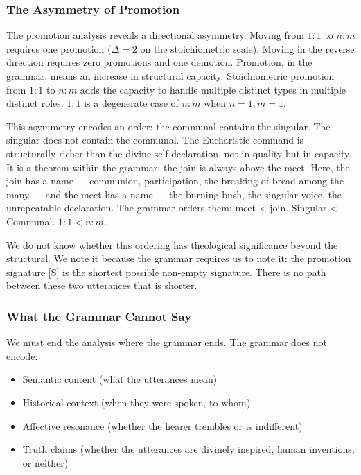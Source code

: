 \documentclass[12pt,a4paper]{article}
\begin{document}
\subsubsection{The Asymmetry of Promotion}

The promotion analysis reveals a directional asymmetry. Moving from $1{:}1$ to $n{:}m$ requires one promotion ($\Delta = 2$ on the stoichiometric scale). Moving in the reverse direction requires zero promotions and one demotion. Promotion, in the grammar, means an increase in structural capacity. Stoichiometric promotion from $1{:}1$ to $n{:}m$ adds the capacity to handle multiple distinct types in multiple distinct roles. $1{:}1$ is a degenerate case of $n{:}m$ when $n = 1, m = 1$.

This asymmetry encodes an order: the communal contains the singular. The singular does not contain the communal. The Eucharistic command is structurally richer than the divine self-declaration, not in quality but in capacity. It is a theorem within the grammar: the join is always above the meet. Here, the join has a name --- communion, participation, the breaking of bread among the many --- and the meet has a name --- the burning bush, the singular voice, the unrepeatable declaration. The grammar orders them: meet \textless{} join. Singular \textless{} Communal. $1{:}1 < n{:}m$.

We do not know whether this ordering has theological significance beyond the structural. We note it because the grammar requires us to note it: the promotion signature {[}S{]} is the shortest possible non-empty signature. There is no path between these two utterances that is shorter.

\subsubsection{What the Grammar Cannot Say}

We must end the analysis where the grammar ends. The grammar does not encode:

\begin{itemize}
    \item Semantic content (what the utterances mean)
    \item Historical context (when they were spoken, to whom)
    \item Affective resonance (whether the hearer trembles or is indifferent)
    \item Truth claims (whether the utterances are divinely inspired, human inventions, or neither)
\end{itemize}
\end{document}
